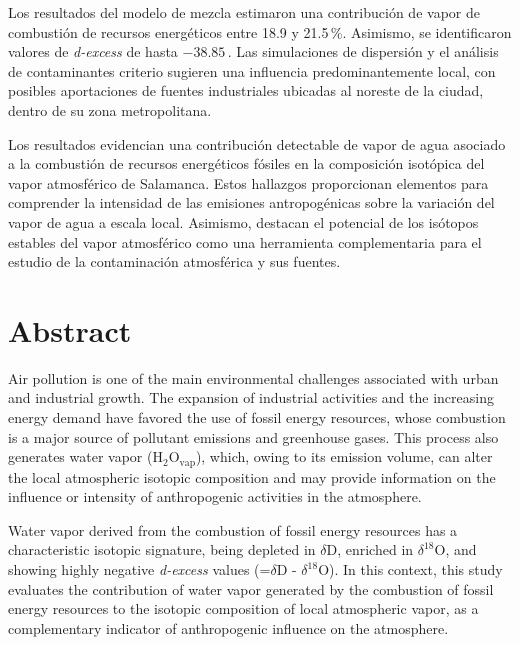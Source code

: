 Los resultados del modelo de mezcla estimaron una contribución de vapor de 
combustión de recursos energéticos entre 18.9 y 21.5\,\%. Asimismo, se identificaron valores 
de \textit{d-excess} de hasta $-38.85$\,\textperthousand{}. Las simulaciones de 
dispersión y el análisis de contaminantes criterio sugieren una influencia 
predominantemente local, con posibles aportaciones de fuentes industriales 
ubicadas al noreste de la ciudad, dentro de su zona metropolitana.

Los resultados evidencian una contribución detectable de vapor de agua 
asociado a la combustión de recursos energéticos fósiles en la composición 
isotópica del vapor atmosférico de Salamanca. Estos hallazgos 
proporcionan elementos para comprender la intensidad de las emisiones 
antropogénicas sobre la variación  
del vapor de agua a escala local. Asimismo, destacan el potencial de los 
isótopos estables del vapor atmosférico como una herramienta complementaria 
para el estudio de la contaminación atmosférica y sus fuentes.

\chapter*{Abstract}

Air pollution is one of the main environmental challenges associated 
with urban and industrial growth. The expansion of industrial activities 
and the increasing energy demand have favored the use of fossil energy 
resources, whose combustion is a major source of pollutant emissions and 
greenhouse gases. This process also generates water vapor ($\mathrm{H_2O_{vap}}$), 
which, owing to its emission volume, can alter the local atmospheric 
isotopic composition and may provide information on the influence 
or intensity of anthropogenic activities in the atmosphere.

Water vapor derived from the combustion of fossil energy 
resources has a characteristic isotopic signature, being depleted 
in $\delta\mathrm{D}$, enriched in $\delta^{18}\mathrm{O}$, 
and showing highly negative \textit{d-excess} values 
(=$\delta\mathrm{D}$ - $\delta^{18}\mathrm{O}$). In this context, 
this study evaluates the contribution of water vapor generated 
by the combustion of fossil energy resources to the isotopic 
composition of local atmospheric vapor, as a complementary 
indicator of anthropogenic influence on the atmosphere.

